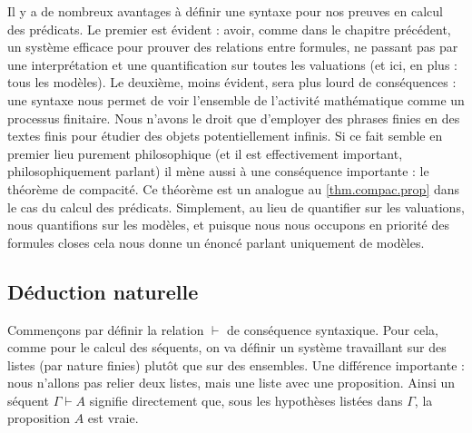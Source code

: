 Il y a de nombreux avantages à définir une syntaxe pour nos preuves en calcul des
prédicats. Le premier est évident : avoir, comme dans le chapitre précédent, un
système efficace pour prouver des relations entre formules, ne passant pas par
une interprétation et une quantification sur toutes les valuations (et ici, en
plus : tous les modèles). Le deuxième, moins évident, sera plus lourd de
conséquences : une syntaxe nous permet de voir l'ensemble de l'activité
mathématique comme un processus finitaire. Nous n'avons le droit que d'employer
des phrases finies en des textes finis pour étudier des objets potentiellement
infinis. Si ce fait semble en premier lieu purement philosophique (et il est
effectivement important, philosophiquement parlant) il mène aussi à une
conséquence importante : le théorème de compacité. Ce théorème est un analogue
au \cref{thm.compac.prop} dans le cas du calcul des prédicats. Simplement, au
lieu de quantifier sur les valuations, nous quantifions sur les modèles, et
puisque nous nous occupons en priorité des formules closes cela nous donne un
énoncé parlant uniquement de modèles.

\subsection{Déduction naturelle}

Commençons par définir la relation $\vdash$ de conséquence syntaxique. Pour
cela, comme pour le calcul des séquents, on va définir un système travaillant
sur des listes (par nature finies) plutôt que sur des ensembles. Une différence
importante : nous n'allons pas relier deux listes, mais une liste avec une
proposition. Ainsi un séquent $\Gamma\vdash A$ signifie directement que, sous
les hypothèses listées dans $\Gamma$, la proposition $A$ est vraie.

